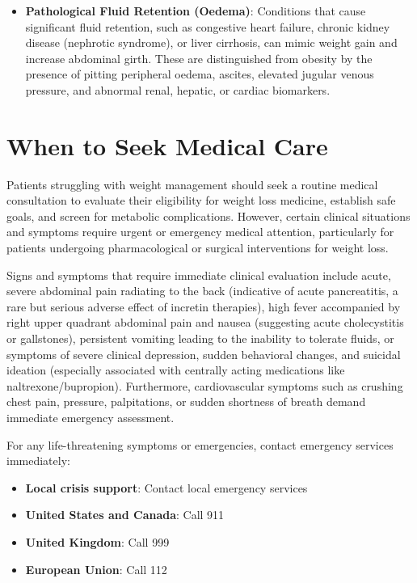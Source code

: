 \begin{itemize}
\item \textbf{Pathological Fluid Retention (Oedema)}: Conditions that cause significant fluid retention, such as congestive heart failure, chronic kidney disease (nephrotic syndrome), or liver cirrhosis, can mimic weight gain and increase abdominal girth. These are distinguished from obesity by the presence of pitting peripheral oedema, ascites, elevated jugular venous pressure, and abnormal renal, hepatic, or cardiac biomarkers.
\end{itemize}

\section*{When to Seek Medical Care}
Patients struggling with weight management should seek a routine medical consultation to evaluate their eligibility for weight loss medicine, establish safe goals, and screen for metabolic complications. However, certain clinical situations and symptoms require urgent or emergency medical attention, particularly for patients undergoing pharmacological or surgical interventions for weight loss.

Signs and symptoms that require immediate clinical evaluation include acute, severe abdominal pain radiating to the back (indicative of acute pancreatitis, a rare but serious adverse effect of incretin therapies), high fever accompanied by right upper quadrant abdominal pain and nausea (suggesting acute cholecystitis or gallstones), persistent vomiting leading to the inability to tolerate fluids, or symptoms of severe clinical depression, sudden behavioral changes, and suicidal ideation (especially associated with centrally acting medications like naltrexone/bupropion). Furthermore, cardiovascular symptoms such as crushing chest pain, pressure, palpitations, or sudden shortness of breath demand immediate emergency assessment.

For any life-threatening symptoms or emergencies, contact emergency services immediately:
\begin{itemize}
\item \textbf{Local crisis support}: Contact local emergency services
\item \textbf{United States and Canada}: Call 911
\item \textbf{United Kingdom}: Call 999
\item \textbf{European Union}: Call 112
\end{itemize}

